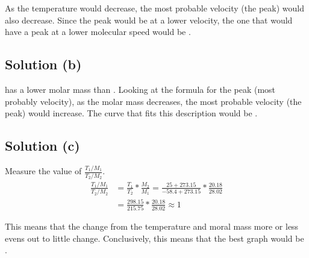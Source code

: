 \documentclass[10pt]{article}
\begin{document}
            As the temperature would decrease, the most probable velocity (the peak) would also decrease.
            Since the peak would be at a lower velocity, the one that would have a peak at a lower molecular speed would be .

        \subsection{Solution (b)}
             has a lower molar mass than . 
            Looking at the formula for the peak (most probably velocity), as the molar mass decreases, the most probable velocity (the peak) would increase. 
            The curve that fits this description would be .

        \subsection{Solution (c)}
            Measure the value of $\frac{T_1 / M_1}{T_2 / M_2}$. 
            \begin{align}
                \frac{T_1 / M_1}{T_2 / M_2} &=  \frac{T_1}{T_2} * \frac{M_2}{M_1}
                    =   \frac{25 + 273.15}{-58.4 + 273.15} * \frac{20.18}{28.02}\\
                    &=  \frac{298.15}{215.75} * \frac{20.18}{28.02}
                    \approx 1
            \end{align}
            
            This means that the change from the temperature and moral mass more or less evens out to little change.
            Conclusively, this means that the best graph would be . 

    \pagebreak
\end{document}
